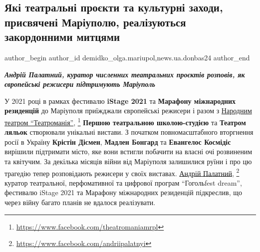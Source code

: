  
 
 
 
 
 
\subsection{Які театральні проєкти та культурні заходи, присвячені Маріуполю, реалізуються закордонними митцями}
\label{sec:31_07_2022.stz.news.ua.donbas24.1.jaki_teatr_proekty_mrpl_zakordon_mytci}
 
\ifcmt
 author_begin
   author_id demidko_olga.mariupol,news.ua.donbas24
 author_end
\fi


\begin{center}
  \em\color{blue}\bfseries\Large
Андрій Палатний, куратор численних театральних проєктів розповів, як
європейські режисери підтримують Маріуполь
\end{center}

У 2021 році в рамках фестивалю \textbf{iStage 2021} та \textbf{Марафону
міжнародних резиденцій} до Маріуполя приїжджали європейські режисери і разом з
\href{https://www.facebook.com/theatromaniamrpl}{Народним театром \enquote{Театроманія}},
\footnote{\url{https://www.facebook.com/theatromaniamrpl}}
 \textbf{Першою театральною школою-студією} та \textbf{Театром ляльок} створювали унікальні вистави. З
початком повномасштабного вторгнення росії в Україну \textbf{Крістін Дісмен},
\textbf{Мадлен Бонгард} та \textbf{Евангелос Космідіс} вирішили підтримати
місто, яке вони встигли побачити на власні очі розвиненим та квітучим. За
декілька місяців війни від Маріуполя залишилися руїни і про цю трагедію тепер
розповідають режисери у своїх виставах. \href{https://www.facebook.com/andriipalatnyi}{Андрій Палатний},
\footnote{\url{https://www.facebook.com/andriipalatnyi}}
куратор театральної,
перфомативної та цифрової програм \enquote{Гогольfest dream}, фестивалю iStage
2021 та Марафону міжнародних резиденцій підкреслив, що через війну багато
планів не вдалося реалізувати.

